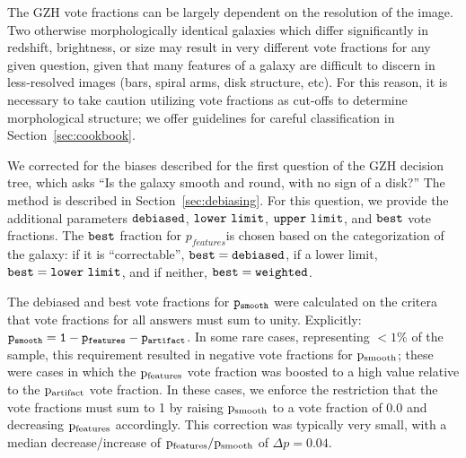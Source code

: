 \documentclass[twocolumn]{aastex6}
\begin{document}
The GZH vote fractions can be largely dependent on the resolution of the image. Two otherwise morphologically identical galaxies which differ significantly in redshift, brightness, or size may result in very different vote fractions for any given question, given that many features of a galaxy are difficult to discern in less-resolved images (bars, spiral arms, disk structure, etc). For this reason, it is necessary to take caution utilizing vote fractions as cut-offs to determine morphological structure; we offer guidelines for careful classification in Section~\ref{sec:cookbook}. 

We corrected for the biases described for the first question of the GZH decision tree, which asks ``Is the galaxy smooth and round, with no sign of a disk?'' The method is described in Section~\ref{sec:debiasing}. For this question, we provide the additional parameters $\tt debiased$, $\tt lower~limit$, $\tt upper~limit$, and $\tt best$ vote fractions. The $\tt best$ fraction for $p_{features}$is chosen based on the categorization of the galaxy: if it is ``correctable'', $\tt best = debiased$, if a lower limit, $\tt best = lower~limit$, and if neither, $\tt best = weighted$. 

The debiased and best vote fractions for $\tt p_{smooth}$ were calculated on the critera that vote fractions for all answers must sum to unity. Explicitly: $\tt p_{smooth} = 1 - p_{features} - p_{artifact}$. In some rare cases, representing  $<1\%$ of the sample, this requirement resulted in negative vote fractions for $\rm p_{smooth}$; these were cases in which the $\rm p_{features}$ vote fraction was boosted to a high value relative to the $\rm p_{artifact}$ vote fraction. In these cases, we enforce the restriction that the vote fractions must sum to 1 by raising $\rm p_{smooth}$ to a vote fraction of 0.0 and decreasing $\rm p_{features}$ accordingly. This correction was typically very small, with a median decrease/increase of $\rm p_{features}/p_{smooth}$ of $\Delta p = 0.04$.
\end{document}
